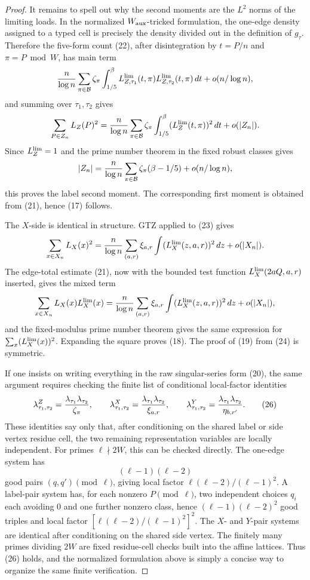 \documentclass[11pt]{article}
\newcommand{\B}{\mathcal B}
\begin{document}
\begin{proof}
It remains to spell out why the second moments are the $L^2$ norms of the
limiting loads.  In the normalized $W_{\rm aux}$-tricked formulation, the
one-edge density assigned to a typed cell is precisely the density divided out
in the definition of $g_\tau$.  Therefore the five-form count (22), after
disintegration by $t=P/n$ and $\pi=P\bmod W$, has main term
\[
  {n\over\log n}
  \sum_{\pi\in\B}\zeta_\pi
  \int_{1/5}^{\beta}
  L_{Z,\tau_1}^{\rm lim}(t,\pi)
  L_{Z,\tau_2}^{\rm lim}(t,\pi)\,dt
  +o(n/\log n),
\]
and summing over $\tau_1,\tau_2$ gives
\[
  \sum_{P\in Z_n}L_Z(P)^2
  =
  {n\over\log n}
  \sum_{\pi\in\B}\zeta_\pi
  \int_{1/5}^{\beta}(L_Z^{\rm lim}(t,\pi))^2\,dt
  +o(|Z_n|).
\]
Since $L_Z^{\rm lim}=1$ and the prime number theorem in the fixed robust
classes gives
\[
  |Z_n|=
  {n\over\log n}\sum_{\pi\in\B}\zeta_\pi(\beta-1/5)+o(n/\log n),
\]
this proves the label second moment.  The corresponding first moment is obtained
from (21), hence (17) follows.

The $X$-side is identical in structure.  GTZ applied to (23) gives
\[
  \sum_{x\in X_n}L_X(x)^2
  =
  {n\over\log n}
  \sum_{(a,r)}\xi_{a,r}
  \int (L_X^{\rm lim}(z,a,r))^2\,dz
  +o(|X_n|).
\]
The edge-total estimate (21), now with the bounded test function
$L_X^{\rm lim}(2aQ,a,r)$ inserted, gives the mixed term
\[
  \sum_{x\in X_n}L_X(x)L_X^{\rm lim}(x)
  =
  {n\over\log n}
  \sum_{(a,r)}\xi_{a,r}
  \int (L_X^{\rm lim}(z,a,r))^2\,dz
  +o(|X_n|),
\]
and the fixed-modulus prime number theorem gives the same expression for
$\sum_x (L_X^{\rm lim}(x))^2$.  Expanding the square proves (18).  The proof of
(19) from (24) is symmetric.

If one insists on writing everything in the raw singular-series form (20), the
same argument requires checking the finite list of conditional local-factor
identities
\[
  \lambda^Z_{\tau_1,\tau_2}={\lambda_{\tau_1}\lambda_{\tau_2}\over \zeta_\pi},
  \qquad
  \lambda^X_{\tau_1,\tau_2}={\lambda_{\tau_1}\lambda_{\tau_2}\over \xi_{a,r}},
  \qquad
  \lambda^Y_{\tau_1,\tau_2}={\lambda_{\tau_1}\lambda_{\tau_2}\over \eta_{b,r'}}. \tag{26}
\]
These identities say only that, after conditioning on the shared label or side
vertex residue cell, the two remaining representation variables are locally
independent.  For primes $\ell\nmid2W$, this can be checked directly.  The
one-edge system has
\[
  (\ell-1)(\ell-2)
\]
good pairs $(q,q')\pmod\ell$, giving local factor
$\ell(\ell-2)/(\ell-1)^2$.  A label-pair system has, for each nonzero
$P\pmod\ell$, two independent choices $q_i$ each avoiding $0$ and one further
nonzero class, hence $(\ell-1)(\ell-2)^2$ good triples and local factor
$[\ell(\ell-2)/(\ell-1)^2]^2$.  The $X$- and $Y$-pair systems are identical
after conditioning on the shared side vertex.  The finitely many primes
dividing $2W$ are fixed residue-cell checks built into the affine lattices.
Thus (26) holds, and the normalized formulation above is simply a concise way
to organize the same finite verification.
\end{proof}
\end{document}
